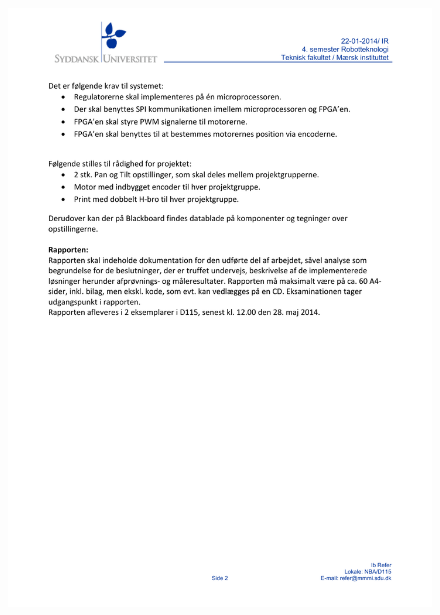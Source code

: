 \begin{figure}[th!]
\centering
\includegraphics[scale=0.74125]{./content/Projekt_2014-2.pdf}
\end{figure}

